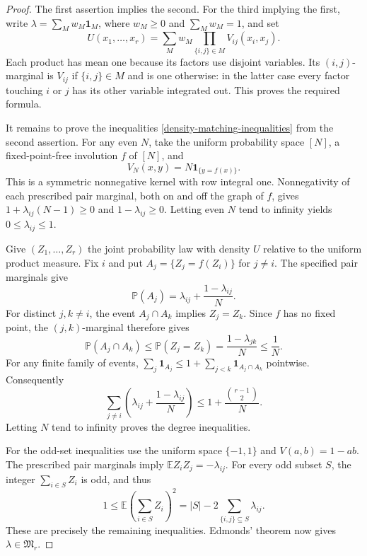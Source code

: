 \documentclass[a4paper,11pt,reqno]{amsart}
\theoremstyle{plain}
\theoremstyle{definition}
\theoremstyle{remark}
\begin{document}
\begin{proof}
The first assertion implies the second.  For the third implying the
first, write $\lambda=\sum_M w_M\mathbf1_M$, where $w_M\ge0$ and
$\sum_Mw_M=1$, and set
\[
 U(x_1,\ldots,x_r)
   =\sum_Mw_M\prod_{\{i,j\}\in M}V_{ij}(x_i,x_j).
\]
Each product has mean one because its factors use disjoint variables.
Its $(i,j)$-marginal is $V_{ij}$ if $\{i,j\}\in M$ and is one
otherwise: in the latter case every factor touching $i$ or $j$ has
its other variable integrated out.  This proves the required formula.

It remains to prove the inequalities
\eqref{density-matching-inequalities} from the second assertion.
For any even $N$, take the uniform probability space $[N]$, a
fixed-point-free involution $f$ of $[N]$, and
\[
 V_N(x,y)=N\mathbf1_{\{y=f(x)\}}.
\]
This is a symmetric nonnegative kernel with row integral one.
Nonnegativity of each prescribed pair marginal, both on and off
the graph of $f$, gives
$1+\lambda_{ij}(N-1)\ge0$ and $1-\lambda_{ij}\ge0$.
Letting even $N$ tend to infinity yields $0\le\lambda_{ij}\le1$.

Give $(Z_1,\ldots,Z_r)$ the joint probability law with density $U$
relative to the uniform product measure.  Fix $i$ and put
$A_j=\{Z_j=f(Z_i)\}$ for $j\ne i$.  The specified pair marginals
give
\[
 \mathbb P(A_j)=\lambda_{ij}+\frac{1-\lambda_{ij}}N.
\]
For distinct $j,k\ne i$, the event $A_j\cap A_k$ implies
$Z_j=Z_k$.  Since $f$ has no fixed point, the $(j,k)$-marginal
therefore gives
\[
 \mathbb P(A_j\cap A_k)
 \le\mathbb P(Z_j=Z_k)=\frac{1-\lambda_{jk}}N\le\frac1N.
\]
For any finite family of events,
$\sum_j\mathbf1_{A_j}\le
1+\sum_{j<k}\mathbf1_{A_j\cap A_k}$ pointwise.  Consequently
\[
 \sum_{j\ne i}\left(\lambda_{ij}
           +\frac{1-\lambda_{ij}}N\right)
 \le1+\frac{\binom{r-1}{2}}N.
\]
Letting $N$ tend to infinity proves the degree inequalities.

For the odd-set inequalities use the uniform space $\{-1,1\}$
and $V(a,b)=1-ab$.  The prescribed pair marginals imply
$\mathbb E Z_iZ_j=-\lambda_{ij}$.  For every odd subset $S$,
the integer $\sum_{i\in S}Z_i$ is odd, and thus
\[
 1\le\mathbb E\left(\sum_{i\in S}Z_i\right)^2
   =|S|-2\sum_{\{i,j\}\subseteq S}\lambda_{ij}.
\]
These are precisely the remaining inequalities.  Edmonds' theorem
now gives $\lambda\in\mathfrak M_r$.
\end{proof}
\end{document}
